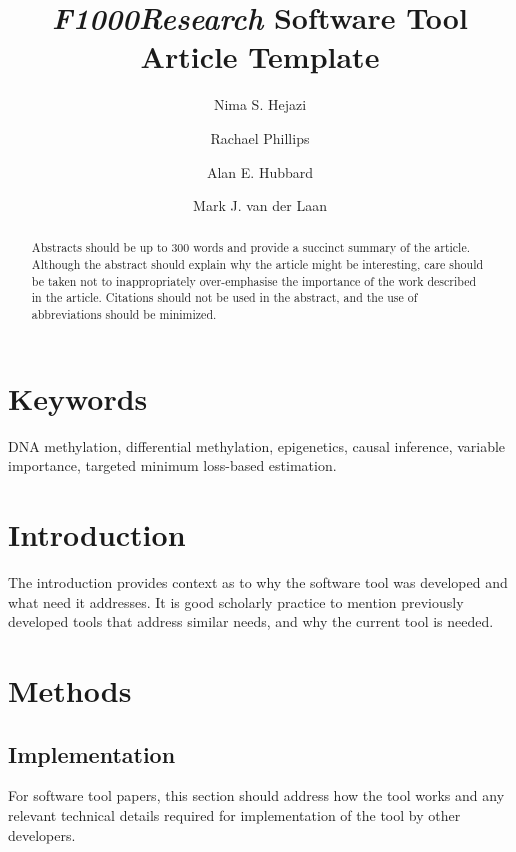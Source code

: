 \documentclass[9pt,a4paper,]{extarticle}
\theoremstyle{definition}
\theoremstyle{definition}
\theoremstyle{definition}
\theoremstyle{remark}
\begin{document}
\pagestyle{front}

\title{\emph{F1000Research} Software Tool Article Template}

\author[1]{Nima S. Hejazi}
\author[1]{Rachael Phillips}
\author[2]{Alan E. Hubbard}
\author[2]{Mark J. van der Laan}

\maketitle
\thispagestyle{front}

\begin{abstract}
Abstracts should be up to 300 words and provide a succinct summary of
the article. Although the abstract should explain why the article might
be interesting, care should be taken not to inappropriately
over-emphasise the importance of the work described in the article.
Citations should not be used in the abstract, and the use of
abbreviations should be minimized.
\end{abstract}

\section*{Keywords}
DNA methylation, differential methylation, epigenetics, causal
inference, variable importance, targeted minimum loss-based estimation.


\clearpage
\pagestyle{main}

\section{Introduction}\label{introduction}

The introduction provides context as to why the software tool was
developed and what need it addresses. It is good scholarly practice to
mention previously developed tools that address similar needs, and why
the current tool is needed.

\section{Methods}\label{methods}

\subsection{Implementation}\label{implementation}

For software tool papers, this section should address how the tool works
and any relevant technical details required for implementation of the
tool by other developers.
\end{document}
